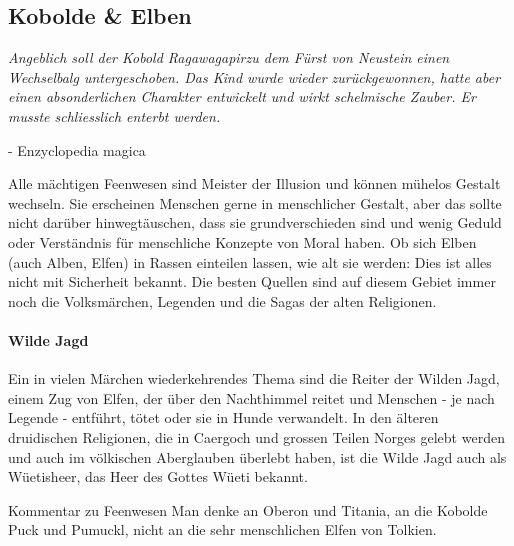 \documentclass[10pt,twoside,twocolumn,openany]{book}
\begin{document}
\subsection{Kobolde \& Elben}
\begin{quotebox}
	\textit{Angeblich soll der Kobold Ragawagapirzu dem Fürst von Neustein einen Wechselbalg untergeschoben. Das Kind wurde wieder zurückgewonnen, hatte aber einen absonderlichen Charakter entwickelt und wirkt schelmische Zauber. Er musste schliesslich enterbt werden.}
	\begin{flushright}
		- Enzyclopedia magica
	\end{flushright}
\end{quotebox}

Alle mächtigen Feenwesen sind Meister der Illusion und können mühelos Gestalt wechseln. Sie erscheinen Menschen gerne in menschlicher Gestalt, aber das sollte nicht darüber hinwegtäuschen, dass sie grundverschieden sind und wenig Geduld oder Verständnis für menschliche Konzepte von Moral haben. Ob sich Elben (auch Alben, Elfen) in Rassen einteilen lassen, wie alt sie werden: Dies ist alles nicht mit Sicherheit bekannt. Die besten Quellen sind auf diesem Gebiet immer noch die Volksmärchen, Legenden und die Sagas der alten Religionen.

\paragraph{Wilde Jagd} Ein in vielen Märchen wiederkehrendes Thema sind die Reiter der Wilden Jagd, einem Zug von Elfen, der über den Nachthimmel reitet und Menschen - je nach Legende - entführt, tötet oder  sie in Hunde verwandelt. In den älteren druidischen Religionen, die in Caergoch und grossen Teilen Norges gelebt werden und auch im völkischen Aberglauben überlebt haben, ist die Wilde Jagd auch als Wüetisheer, das Heer des Gottes Wüeti bekannt.


\begin{commentbox}{Kommentar zu Feenwesen}
	Man denke an Oberon und Titania, an die Kobolde Puck und Pumuckl, nicht an die sehr menschlichen Elfen von Tolkien.
\end{commentbox}







\end{document}
